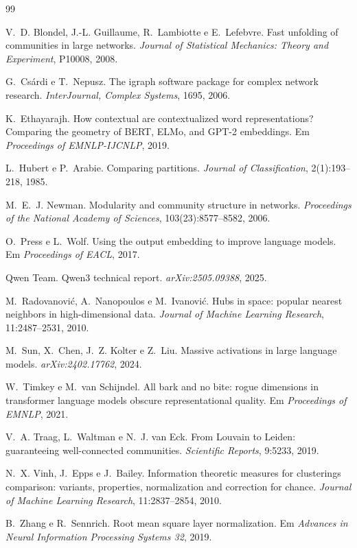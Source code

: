 \documentclass[11pt,a4paper]{article}
\begin{document}
\begin{thebibliography}{99}
\small

V.~D. Blondel, J.-L. Guillaume, R.~Lambiotte e E.~Lefebvre.
Fast unfolding of communities in large networks.
\emph{Journal of Statistical Mechanics: Theory and Experiment}, P10008, 2008.

G.~Csárdi e T.~Nepusz.
The igraph software package for complex network research.
\emph{InterJournal, Complex Systems}, 1695, 2006.

K.~Ethayarajh.
How contextual are contextualized word representations? Comparing the geometry of BERT,
ELMo, and GPT-2 embeddings.
Em \emph{Proceedings of EMNLP-IJCNLP}, 2019.

L.~Hubert e P.~Arabie.
Comparing partitions.
\emph{Journal of Classification}, 2(1):193--218, 1985.

M.~E.~J. Newman.
Modularity and community structure in networks.
\emph{Proceedings of the National Academy of Sciences}, 103(23):8577--8582, 2006.

O.~Press e L.~Wolf.
Using the output embedding to improve language models.
Em \emph{Proceedings of EACL}, 2017.

Qwen Team.
Qwen3 technical report.
\emph{arXiv:2505.09388}, 2025.

M.~Radovanović, A.~Nanopoulos e M.~Ivanović.
Hubs in space: popular nearest neighbors in high-dimensional data.
\emph{Journal of Machine Learning Research}, 11:2487--2531, 2010.

M.~Sun, X.~Chen, J.~Z. Kolter e Z.~Liu.
Massive activations in large language models.
\emph{arXiv:2402.17762}, 2024.

W.~Timkey e M.~van Schijndel.
All bark and no bite: rogue dimensions in transformer language models obscure
representational quality.
Em \emph{Proceedings of EMNLP}, 2021.

V.~A. Traag, L.~Waltman e N.~J. van Eck.
From Louvain to Leiden: guaranteeing well-connected communities.
\emph{Scientific Reports}, 9:5233, 2019.

N.~X. Vinh, J.~Epps e J.~Bailey.
Information theoretic measures for clusterings comparison: variants, properties,
normalization and correction for chance.
\emph{Journal of Machine Learning Research}, 11:2837--2854, 2010.

B.~Zhang e R.~Sennrich.
Root mean square layer normalization.
Em \emph{Advances in Neural Information Processing Systems 32}, 2019.

\end{thebibliography}

\appendix

\end{document}

